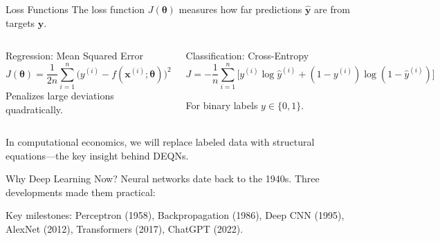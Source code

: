 \documentclass[aspectratio=169,11pt]{beamer}
\newcommand{\emphc}[1]{\textcolor{harvardcrimson}{#1}}
\newcommand{\x}{\bm{x}}
\begin{document}
\begin{frame}{Loss Functions}
The loss function $J(\bm{\theta})$ measures how far predictions $\hat{\bm{y}}$ are from targets $\bm{y}$.

\vspace{0.4cm}
\begin{columns}[T]
\begin{block}{Regression: Mean Squared Error}
\[
    J(\bm{\theta}) = \frac{1}{2n}\sum_{i=1}^{n}\big(y^{(i)} - f(\x^{(i)};\bm{\theta})\big)^{2}
\]
Penalizes large deviations quadratically.
\end{block}

\begin{block}{Classification: Cross-Entropy}
{\small
\[
    J = -\frac{1}{n}\sum_{i=1}^{n}\!\Big[y^{(i)}\!\log\hat{y}^{(i)} + (1{-}y^{(i)})\log(1{-}\hat{y}^{(i)})\Big]
\]}%
\vspace{-0.3cm}

For binary labels $y\in\{0,1\}$.
\end{block}
\end{columns}

\vspace{0.3cm}
{\small In computational economics, we will replace labeled data with \emphc{structural equations}---the key insight behind DEQNs.}
\end{frame}

\begin{frame}{Why Deep Learning Now?}
Neural networks date back to the 1940s.  Three developments made them practical:

\vspace{0.4cm}
\begin{center}
\end{center}

\vspace{0.3cm}
{\small Key milestones: Perceptron (1958), Backpropagation (1986), Deep CNN (1995), AlexNet (2012), Transformers (2017), ChatGPT (2022).}
\end{frame}
\end{document}
